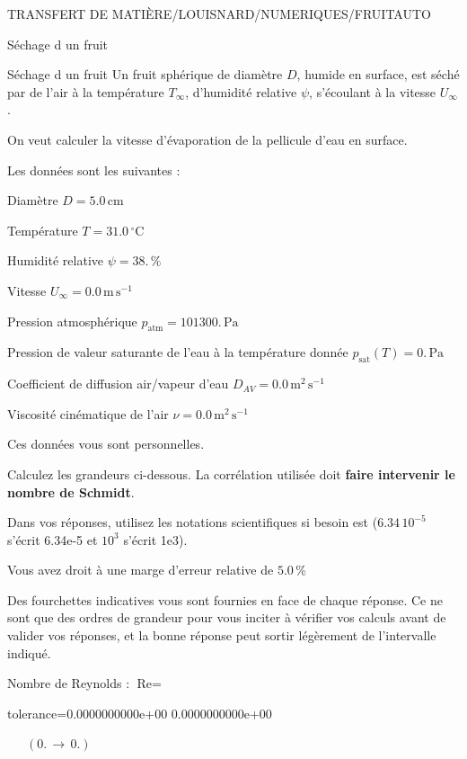 \documentclass[12pt]{article}
\begin{document}
\begin{quiz}{TRANSFERT DE MATIÈRE/LOUISNARD/NUMERIQUES/FRUITAUTO}
\begin{cloze}{Séchage d un fruit}
\end{cloze} 


 \begin{cloze}{Séchage d un fruit} 
Un fruit sphérique de diamètre $D$, humide en surface, est séché par de l'air à la température $T_\infty$, d'humidité relative $\psi$, s'écoulant à la vitesse $U_\infty$.

On veut calculer la vitesse d'évaporation de la pellicule d'eau en surface.

 

Les données sont les suivantes :

 

Diamètre $D = 5.0\,  \mathrm{cm} $

Température $T = 31.0\,  \mathrm{^\circ\mathrm{C}} $

Humidité relative $\psi = 38.\, \% $

Vitesse $U_\infty = 0.0\,  \mathrm{m}\,  \mathrm{s}^{-1} $

Pression atmosphérique $p_{\text{atm}} = 101300.\,  \mathrm{Pa} $

Pression de valeur saturante de l’eau à la température donnée $p_{\text{sat}}(T) = 0.\,  \mathrm{Pa} $

Coefficient de diffusion air/vapeur d’eau $D_{AV} = 0.0\,  \mathrm{m}^{2}\,  \mathrm{s}^{-1} $

Viscosité cinématique de l’air $\nu = 0.0\,  \mathrm{m}^{2}\,  \mathrm{s}^{-1} $

Ces données vous sont personnelles.

 

Calculez les grandeurs ci-dessous. La corrélation utilisée doit \textbf{faire intervenir le nombre de Schmidt}.

Dans vos réponses, utilisez les notations scientifiques si besoin est ($6.34\, 10^{-5}$ s'écrit 6.34e-5 et $10^{3}$ s'écrit 1e3).

Vous avez droit à une marge d'erreur relative de $5.0\, \% $

Des fourchettes indicatives vous sont fournies en face de chaque réponse. Ce ne sont que des ordres de grandeur pour vous inciter à vérifier vos calculs avant de valider vos réponses, et la bonne réponse peut sortir légèrement de l'intervalle indiqué.

 

Nombre de Reynolds : $\text{Re} =  $
\begin{numerical}[points=1] 
\item[tolerance={0.0000000000e+00}] 0.0000000000e+00 
\end{numerical} 
 $\,$ 
 $ \quad (0. \, \rightarrow \, 0.) $ 


\end{cloze}
\end{quiz}
\end{document}
